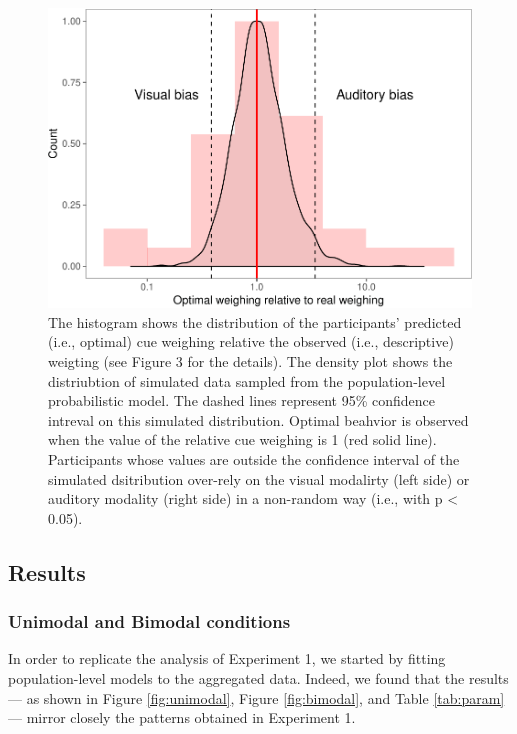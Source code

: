 \documentclass[english,,man,floatsintext]{apa6}
\theoremstyle{definition}
\theoremstyle{definition}
\theoremstyle{definition}
\theoremstyle{remark}
\begin{document}
\begin{figure}[!h]
\includegraphics[width=\textwidth]{ms_files/figure-latex/weights-1} \caption{The histogram shows the distribution of the participants' predicted (i.e., optimal) cue weighing relative the observed (i.e., descriptive) weigting (see Figure 3 for the details). The density plot shows the distriubtion of simulated data sampled from the population-level probabilistic model. The dashed lines represent 95\% confidence intreval on this simulated distribution. Optimal beahvior is observed when the value of the relative cue weighing is 1 (red solid line). Participants whose values are outside the confidence interval of the simulated dsitribution over-rely on the visual modalirty (left side) or auditory modality (right side) in a non-random way (i.e., with p < 0.05).}\label{fig:weights}
\end{figure}

\subsection{Results}\label{results-2}

\subsubsection{Unimodal and Bimodal
conditions}\label{unimodal-and-bimodal-conditions}

In order to replicate the analysis of Experiment 1, we started by
fitting population-level models to the aggregated data. Indeed, we found
that the results --- as shown in Figure \ref{fig:unimodal}, Figure
\ref{fig:bimodal}, and Table \ref{tab:param} --- mirror closely the
patterns obtained in Experiment 1.
\end{document}
